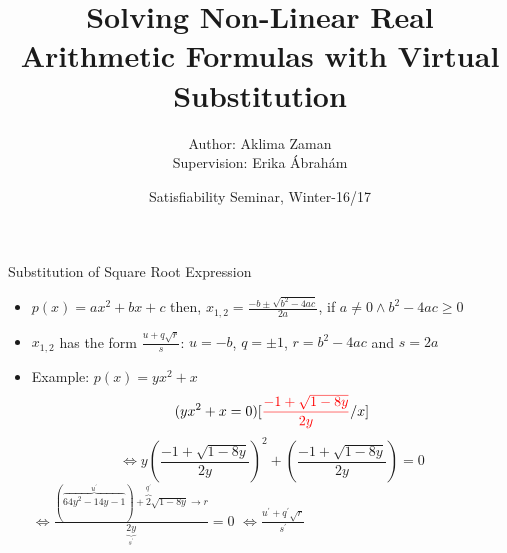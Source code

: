 \documentclass{beamer}
\title[]
{%
Solving Non-Linear Real Arithmetic Formulas with Virtual Substitution%
}
\author[Zaman]
{
	Author: Aklima Zaman
	\\ Supervision: Erika \'{A}brah\'{a}m
}
\institute[]
{
	Theory of Hybrid Systems - Informatik 2 - RWTH-Aachen
}
\date[WABI 2006]
{Satisfiability Seminar, Winter-16/17}
\begin{document}
\begin{frame}{Substitution of Square Root Expression}
	\begin{itemize}
		\item $p(x) = ax^{2} + bx + c$ then, $x_{1,2} = \frac{-b \pm \sqrt{b^{2}-4ac}}{2a}$, if $a\neq0\wedge b^{2}-4ac\geq 0$
		\item $x_{1,2}$ has the form $\frac{u+q\sqrt{r}}{s}$:
		$u=-b$, $q=\pm 1$, $r = b^{2}-4ac$ and $s=2a$
		\\
		\item Example:
		$p(x) = yx^{2}+x$\\
		$$(yx^{2}+x= 0)[{\color{red}\frac{-1+\sqrt{1-8y}}{2y}}/x]$$
		$$\Longleftrightarrow y(\frac{-1+\sqrt{1-8y}}{2y})^{2}+(\frac{-1+\sqrt{1-8y}}{2y})= 0$$
		$\Longleftrightarrow \frac{(\overbrace{64y^{2}-14y-1}\limits^{u^{\prime}})+\overbrace{2}\limits^{q^{\prime}}\sqrt{1-8y}\longrightarrow r}{\underbrace{2y}\limits_{s^{\prime}}}=0$
		$\Longleftrightarrow\frac{u^{\prime}+q^{\prime}\sqrt{r}}{s^{\prime}}$
		
	\end{itemize}
\end{frame}
\end{document}

